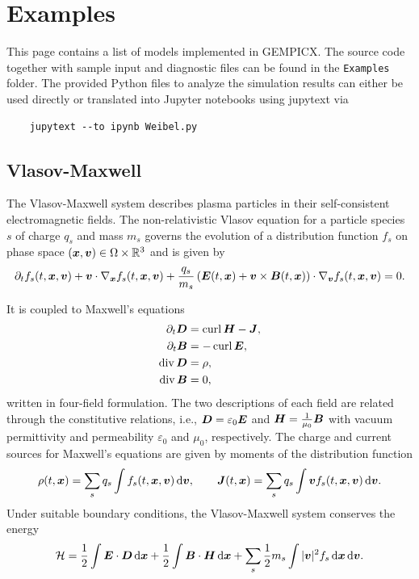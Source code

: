 \documentclass[11pt]{article}
\begin{document}
\section{Examples}

This page contains a list of models implemented in GEMPICX. The source code together with sample input and diagnostic files can be found in the \verb|Examples| folder.
The provided Python files to analyze the simulation results can either be used directly or translated into Jupyter notebooks using jupytext via
\begin{lstlisting}
    jupytext --to ipynb Weibel.py 
\end{lstlisting}

\subsection{Vlasov-Maxwell}

The Vlasov-Maxwell system describes plasma particles in their self-consistent electromagnetic fields. The non-relativistic Vlasov equation for a particle species $s$ of charge $q_s$ and mass $m_s$ governs the evolution of a distribution function $f_s$ on phase space $({\boldsymbol x}, {\boldsymbol v}) \in \Omega \times \mathbb{R}^3$ and is given by
\begin{equation}
    \label{eq:vlasov}
    {\partial_{t}} f_s(t,{\boldsymbol x},{\boldsymbol v}) + {\boldsymbol v} \cdot \nabla_{\boldsymbol x} f_s(t,{\boldsymbol x},{\boldsymbol v}) + \frac{q_s}{m_s} \left(\boldsymbol E(t,{\boldsymbol x}) + {\boldsymbol v} \times \boldsymbol B(t,{\boldsymbol x})\right) \cdot \nabla_{\boldsymbol v} f_s(t,{\boldsymbol x},{\boldsymbol v}) = 0.
\end{equation}

It is coupled to Maxwell's equations
\begin{equation}
    \label{eq:maxwell_example}
    \begin{aligned}
        {\partial_{t}} \boldsymbol D  & = \operatorname{curl} \boldsymbol H - \boldsymbol J, \\
        {\partial_{t}} \boldsymbol B  & = - \operatorname{curl} \boldsymbol E,       \\
        \operatorname{div} \boldsymbol D & = \rho,                \\
        \operatorname{div} \boldsymbol B & = 0,
    \end{aligned}
\end{equation}
written in four-field formulation. The two descriptions of each field are related through the constitutive relations, i.e., $\boldsymbol D = \varepsilon_0 \boldsymbol E$ and $\boldsymbol H = \frac{1}{\mu_0} \boldsymbol B$ with vacuum permittivity and permeability $\varepsilon_0$ and $\mu_0$, respectively.
The charge and current sources for Maxwell's equations are given by moments of the distribution function
\begin{equation}
    \label{eq:vlasov_moments}
    \rho(t,{\boldsymbol x}) = \sum_s q_s \int f_s(t,{\boldsymbol x},{\boldsymbol v})\, {\rm d} {\boldsymbol v}, \qquad \boldsymbol J(t,{\boldsymbol x}) = \sum_s q_s \int {\boldsymbol v} f_s(t,{\boldsymbol x},{\boldsymbol v}) \, {\rm d} {\boldsymbol v}.
\end{equation}
Under suitable boundary conditions, the Vlasov-Maxwell system conserves the energy
\begin{equation}
    \mathcal{H} = \frac{1}{2} \int \boldsymbol E \cdot \boldsymbol D \, {\rm d}{\boldsymbol x} + \frac{1}{2} \int \boldsymbol B \cdot \boldsymbol H \, {\rm d}{\boldsymbol x} + \sum_s \frac{1}{2} m_s \int |{\boldsymbol v}|^2 f_s \, {\rm d}{\boldsymbol x} \, {\rm d}{\boldsymbol v}.
\end{equation}
\end{document}
